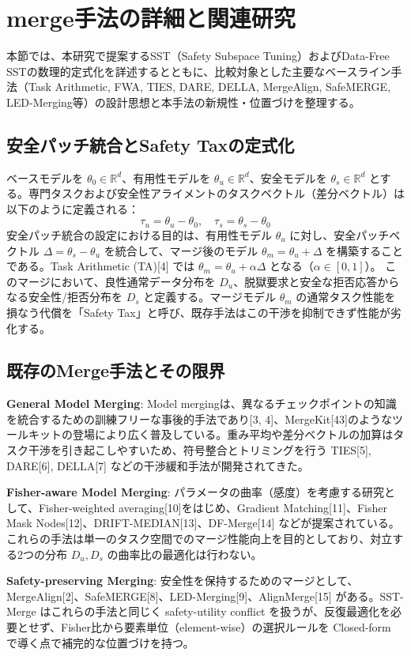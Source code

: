 \documentclass{article}
\begin{document}
\section{merge手法の詳細と関連研究}
本節では、本研究で提案するSST（Safety Subspace Tuning）およびData-Free SSTの数理的定式化を詳述するとともに、比較対象とした主要なベースライン手法（Task Arithmetic, FWA, TIES, DARE, DELLA, MergeAlign, SafeMERGE, LED-Merging等）の設計思想と本手法の新規性・位置づけを整理する。

\subsection{安全パッチ統合とSafety Taxの定式化}
ベースモデルを $\theta_0 \in \mathbb{R}^d$、有用性モデルを $\theta_u \in \mathbb{R}^d$、安全モデルを $\theta_s \in \mathbb{R}^d$ とする。専門タスクおよび安全性アライメントのタスクベクトル（差分ベクトル）は以下のように定義される：
\[ \tau_u = \theta_u - \theta_0, \quad \tau_s = \theta_s - \theta_0 \]
安全パッチ統合の設定における目的は、有用性モデル $\theta_u$ に対し、安全パッチベクトル $\Delta = \theta_s - \theta_u$ を統合して、マージ後のモデル $\theta_m = \theta_u + \Delta$ を構築することである。Task Arithmetic (TA)[4] では $\theta_m = \theta_u + \alpha \Delta$ となる（$\alpha \in [0, 1]$）。
このマージにおいて、良性通常データ分布を $D_u$、脱獄要求と安全な拒否応答からなる安全性/拒否分布を $D_s$ と定義する。マージモデル $\theta_m$ の通常タスク性能を損なう代償を「Safety Tax」と呼び、既存手法はこの干渉を抑制できず性能が劣化する。

\subsection{既存のMerge手法とその限界}
\textbf{General Model Merging}: Model mergingは、異なるチェックポイントの知識を統合するための訓練フリーな事後的手法であり[3, 4]、MergeKit[43]のようなツールキットの登場により広く普及している。重み平均や差分ベクトルの加算はタスク干渉を引き起こしやすいため、符号整合とトリミングを行う TIES[5], DARE[6], DELLA[7] などの干渉緩和手法が開発されてきた。

\textbf{Fisher-aware Model Merging}: パラメータの曲率（感度）を考慮する研究として、Fisher-weighted averaging[10]をはじめ、Gradient Matching[11]、Fisher Mask Nodes[12]、DRIFT-MEDIAN[13]、DF-Merge[14] などが提案されている。これらの手法は単一のタスク空間でのマージ性能向上を目的としており、対立する2つの分布 $D_u, D_s$ の曲率比の最適化は行わない。

\textbf{Safety-preserving Merging}: 安全性を保持するためのマージとして、MergeAlign[2]、SafeMERGE[8]、LED-Merging[9]、AlignMerge[15] がある。SST-Merge はこれらの手法と同じく safety-utility conflict を扱うが、反復最適化を必要とせず、Fisher比から要素単位（element-wise）の選択ルールを Closed-form で導く点で補完的な位置づけを持つ。
\end{document}
